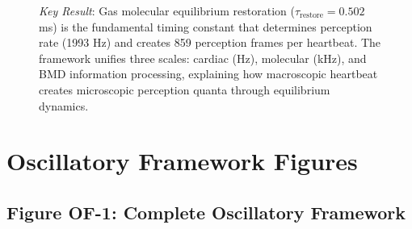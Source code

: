 \documentclass[11pt]{article}
\begin{document}
\begin{figure}[H]
{\textit{Key Result}: Gas molecular equilibrium restoration ($\tau_{\text{restore}} = 0.502$ ms) is the fundamental timing constant that determines perception rate (1993 Hz) and creates 859 perception frames per heartbeat. The framework unifies three scales: cardiac (Hz), molecular (kHz), and BMD information processing, explaining how macroscopic heartbeat creates microscopic perception quanta through equilibrium dynamics.}
\label{fig:heartbeat_unified}
\end{figure}

\clearpage

\section{Oscillatory Framework Figures}

\subsection{Figure OF-1: Complete Oscillatory Framework}
\end{document}
